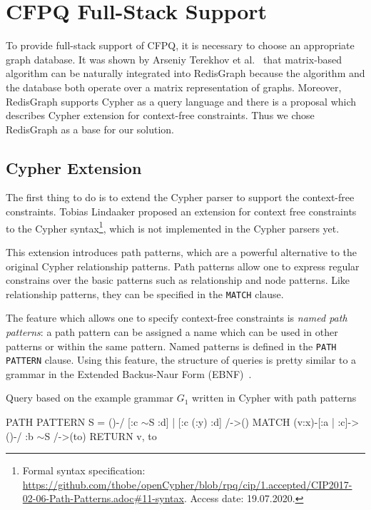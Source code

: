 \section{CFPQ Full-Stack Support}

To provide full-stack support of CFPQ, it is necessary to choose an appropriate graph database.
It was shown by Arseniy Terekhov et al.~\cite{10.1145/3398682.3399163} that matrix-based algorithm can be naturally integrated into RedisGraph because the algorithm and the database both operate over a matrix representation of graphs.
Moreover, RedisGraph supports Cypher as a query language and there is a proposal which describes Cypher extension for context-free constraints.
Thus we chose RedisGraph as a base for our solution.


\subsection{Cypher Extension}
\label{subsec:cypher-extension}

The first thing to do is to extend the Cypher parser to support the context-free constraints.
Tobias Lindaaker proposed an extension  for context free constraints to the Cypher syntax\footnote{\label{cypher-proposal}Formal syntax specification: \url{https://github.com/thobe/openCypher/blob/rpq/cip/1.accepted/CIP2017-02-06-Path-Patterns.adoc\#11-syntax}. Access date: 19.07.2020.}, which is not implemented in the Cypher parsers yet.

This extension introduces path patterns, which are a powerful alternative to the original Cypher relationship patterns.
Path patterns allow one to express regular constrains over the basic patterns such as relationship and node patterns.
Like relationship patterns, they can be specified in the \texttt{MATCH} clause.

The feature which allows one to specify context-free constraints is \textit{named path patterns}: a path pattern can be assigned a name which can be used in other patterns or within the same pattern.
Named patterns is defined in the \texttt{PATH PATTERN} clause.
Using this feature, the structure of queries is pretty similar to a grammar in the Extended Backus-Naur Form (EBNF)~\cite{EBNF_ISO}.

\begin{algorithm}[t]
\begin{algorithmic}[1]
\caption{Query based on the example grammar $G_1$ written in Cypher with path patterns}
\label{lst:cypher_example}
\State PATH PATTERN S = ()-/ [:c $\sim$S :d] | [:c (:y) :d] /->()
\State MATCH (v:x)-[:a | :c]->()-/ :b $\sim$S /->(to)
\State RETURN v, to
\end{algorithmic}
\end{algorithm}


